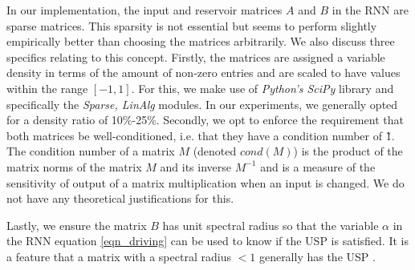 In our implementation, the input and reservoir  matrices $A$ and $B$ in the RNN are sparse matrices. This sparsity is not essential but seems to perform slightly empirically better than choosing the matrices arbitrarily.  We also discuss three specifics relating to this concept. Firstly, the matrices are assigned a variable density in terms of the amount of non-zero entries and are scaled to have values within the range $[-1,1]$. For this, we make use of \textit{Python's SciPy} library and specifically the \textit{Sparse, LinAlg} modules. In our experiments, we generally opted for a density ratio of 10\%-25\%.
Secondly, we opt to enforce the requirement that both matrices be well-conditioned, i.e. that they have a condition number of \~1. The condition number of a matrix $M$ (denoted $cond(M)$) is the product of the matrix norms of the matrix $M$ and its inverse $M^{-1}$ and is a measure of the sensitivity of output of a matrix multiplication when an input is changed.  We do not have any theoretical justifications for this. 


Lastly, we ensure the matrix $B$ has unit spectral radius so that the variable $\alpha$ in the RNN equation \eqref{eqn_driving} can be used to know if the USP is satisfied. It is a  feature that a matrix with a spectral radius $<1$ generally has the USP \cite{yildiz2012re}.  

